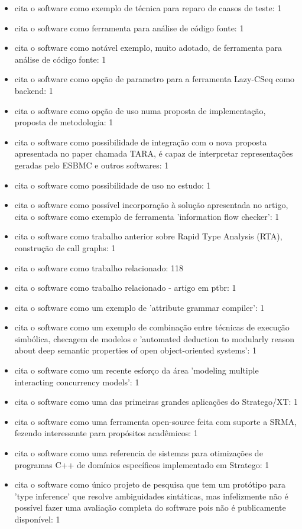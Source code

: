 \begin{itemize}
\item cita o software como exemplo de técnica para reparo de caasos de teste: 1
\item cita o software como ferramenta para análise de código fonte: 1
\item cita o software como notável exemplo, muito adotado, de ferramenta para análise de código fonte: 1
\item cita o software como opção de parametro para a ferramenta Lazy-CSeq como backend: 1
\item cita o software como opção de uso numa proposta de implementação, proposta de metodologia: 1
\item cita o software como possibilidade de integração com o nova proposta apresentada no paper chamada TARA, é capaz de interpretar representações geradas pelo ESBMC e outros softwares: 1
\item cita o software como possibilidade de uso no estudo: 1
\item cita o software como possível incorporação à solução apresentada no artigo, cita o software como exemplo de ferramenta 'information flow checker': 1
\item cita o software como trabalho anterior sobre Rapid Type Analysis (RTA), construção de call graphs: 1
\item cita o software como trabalho relacionado: 118
\item cita o software como trabalho relacionado - artigo em ptbr: 1
\item cita o software como um exemplo de 'attribute grammar compiler': 1
\item cita o software como um exemplo de combinação entre técnicas de execução simbólica, checagem de modelos e 'automated deduction to modularly reason about deep semantic properties of open object-oriented systems': 1
\item cita o software como um recente esforço da área 'modeling multiple interacting concurrency models': 1
\item cita o software como uma das primeiras grandes aplicações do Stratego/XT: 1
\item cita o software como uma ferramenta open-source feita com suporte a SRMA, fezendo interessante para propósitos acadêmicos: 1
\item cita o software como uma referencia de sistemas para otimizações de programas C++ de domínios específicos implementado em Stratego: 1
\item cita o software como único projeto de pesquisa que tem um protótipo para 'type inference' que resolve ambiguidades sintáticas, mas infelizmente não é possível fazer uma avaliação completa do software pois não é publicamente disponível: 1

\end{itemize}
